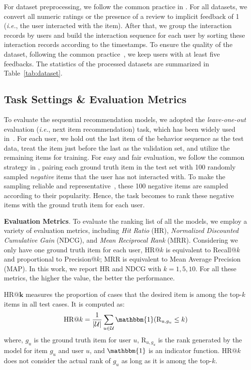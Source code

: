 For dataset preprocessing, we follow the common practice in \cite{Rendle:WWW2010:FPM,Tang:WSDM2018:caser,Kang:ICDM2018:SAS}.
For all datasets, we convert all numeric ratings or the presence of a review to implicit feedback of 1 (\textit{i.e.}, the user interacted with the item).
After that, we group the interaction records by users and build the interaction sequence for each user by sorting these interaction records according to the timestamps.
To ensure the quality of the dataset, following the common practice~\cite{Rendle:WWW2010:FPM,He:www2017:NCF,Tang:WSDM2018:caser,Kang:ICDM2018:SAS}, we keep users with at least five feedbacks.
The statistics of the processed datasets are summarized in Table~\ref{tab:dataset}.

\subsection{Task Settings \& Evaluation Metrics}

To evaluate the sequential recommendation models, we adopted the \textit{leave-one-out} evaluation (\textit{i.e.}, next item recommendation) task, which has been widely used in~\cite{He:www2017:NCF,Tang:WSDM2018:caser,Kang:ICDM2018:SAS}.
For each user, we hold out the last item of the behavior sequence as the test data, treat the item just before the last as the validation set, and utilize the remaining items for training.
For easy and fair evaluation, we follow the common strategy in \cite{He:www2017:NCF,Tang:WSDM2018:caser,Kang:ICDM2018:SAS}, pairing each ground truth item in the test set with 100 randomly sampled \textit{negative} items that the user has not interacted with.
To make the sampling reliable and representative~\cite{Huang:sigir2018:ISR}, these 100 negative items are sampled according to their popularity.
Hence, the task becomes to rank these negative items with the ground truth item for each user.

\textbf{Evaluation Metrics}.
To evaluate the ranking list of all the models, we employ a variety of evaluation metrics, including \textit{Hit Ratio} (HR), \textit{Normalized Discounted Cumulative Gain} (NDCG), and \textit{Mean Reciprocal Rank} (MRR).
Considering we only have one ground truth item for each user, HR@$k$ is equivalent to Recall@$k$ and proportional to Precision@$k$; MRR is equivalent to Mean Average Precision (MAP).
In this work, we report HR and NDCG with $k={1,5,10}$.
For all these metrics, the higher the value, the better the performance.

\iffalse
$\bm{\mathrm{HR}@k}$ measures the proportion of cases that the desired item is among the top-$k$ items in all test cases.
It is computed as: 
\begin{equation*}
    \mathrm{HR}@k = \frac{1}{\vert \mathcal{U} \vert}\sum_{u \in \mathcal{U}} \mathbbm{1}(\mathrm{R}_{u, g_u} \leq k)
\end{equation*}
where, $g_u$ is the ground truth item for user $u$, $\mathrm{R}_{u, g_u}$ is the rank generated by the model for item $g_u$ and user $u$, and $\mathbbm{1}$ is an indicator function.
$\mathrm{HR}@k$ does not consider the actual rank of $g_u$ as long as it is among the top-$k$.

